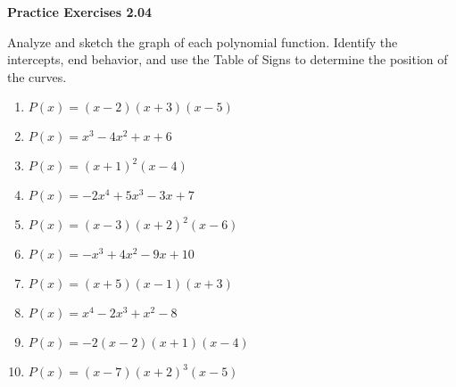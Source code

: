 \vspace{0.3ex}
\noindent\textbf{Practice Exercises 2.04}

\vspace{0.2ex}

Analyze and sketch the graph of each polynomial function. Identify the intercepts, end behavior, and use the Table of Signs to determine the position of the curves.
\begin{multicols}{2}
\begin{enumerate}
    \item \( P(x) = (x - 2)(x + 3)(x - 5) \)
    \item \( P(x) = x^3 - 4x^2 + x + 6 \)
    \item \( P(x) = (x + 1)^2 (x - 4) \)
    \item \( P(x) = -2x^4 + 5x^3 - 3x + 7 \)
    \item \( P(x) = (x - 3)(x + 2)^2(x - 6) \)
    \item \( P(x) = -x^3 + 4x^2 - 9x + 10 \)
    \item \( P(x) = (x + 5)(x - 1)(x + 3) \)
    \item \( P(x) = x^4 - 2x^3 + x^2 - 8 \)
    \item \( P(x) = -2(x - 2)(x + 1)(x - 4) \)
    \item \( P(x) = (x - 7)(x + 2)^3(x - 5) \)
\end{enumerate}
\end{multicols}
